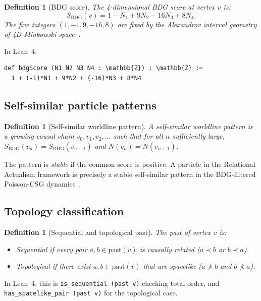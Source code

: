 \documentclass[11pt,a4paper]{article}
\newtheorem{definition}[theorem]{Definition}
\newcommand{\SBDG}{S_{\mathrm{BDG}}}
\begin{document}
\begin{definition}[BDG score]
The 4-dimensional BDG score at vertex $v$ is:
\[
  \SBDG(v) = 1 - N_1 + 9N_2 - 16N_3 + 8N_4.
\]
The five integers $(1,-1,9,-16,8)$ are fixed by the Alexandrov interval
geometry of 4D Minkowski space~\citep{Benincasa2010}.
\end{definition}

In Lean~4:
\begin{verbatim}
def bdgScore (N1 N2 N3 N4 : \mathbb{Z}) : \mathbb{Z} :=
  1 + (-1)*N1 + 9*N2 + (-16)*N3 + 8*N4
\end{verbatim}

\subsection{Self-similar particle patterns}

\begin{definition}[Self-similar worldline pattern]
A \emph{self-similar worldline pattern} is a growing causal chain
$v_0, v_1, v_2, \ldots$ such that for all $n$ sufficiently large,
$\SBDG(v_n) = \SBDG(v_{n+1})$ and $N(v_n) = N(v_{n+1})$.
\end{definition}

The pattern is \emph{stable} if the common score is positive.
A particle in the Relational Actualism framework is precisely a stable
self-similar pattern in the BDG-filtered Poisson-CSG
dynamics~\citep{Sandeman2026RASM}.

\subsection{Topology classification}

\begin{definition}[Sequential and topological past]
The past of vertex $v$ is:
\begin{itemize}[noitemsep]
  \item \emph{Sequential} if every pair $a,b \in \mathrm{past}(v)$ is
    causally related ($a \prec b$ or $b \prec a$).
  \item \emph{Topological} if there exist $a,b \in \mathrm{past}(v)$
    that are spacelike ($a \not\prec b$ and $b \not\prec a$).
\end{itemize}
\end{definition}

In Lean~4, this is \texttt{is\_sequential (past v)} checking total order,
and \texttt{has\_spacelike\_pair (past v)} for the topological case.
\end{document}
